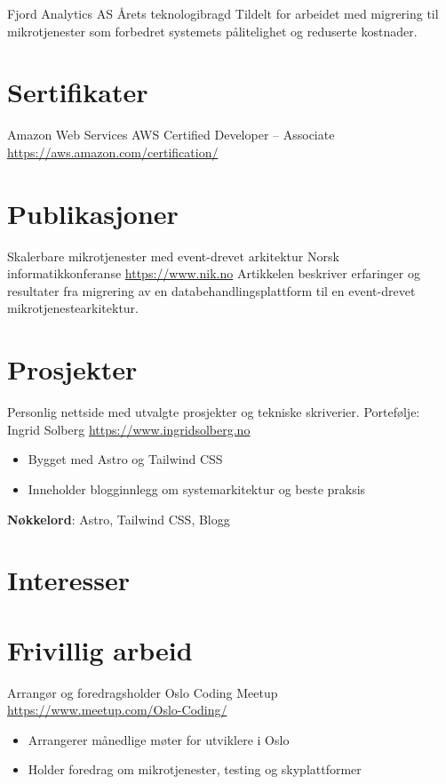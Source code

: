 \documentclass[a4paper, serif, 10pt]{moderncv}
\begin{document}
        {Fjord Analytics AS}
        {Årets teknologibragd}
        {}
        {}
        {Tildelt for arbeidet med migrering til mikrotjenester som forbedret systemets pålitelighet og reduserte kostnader.}
\section{Sertifikater}

        {Amazon Web Services}
        {AWS Certified Developer – Associate}
        {\url{https://aws.amazon.com/certification/}}
        {}
        {}
\section{Publikasjoner}

        {Skalerbare mikrotjenester med event-drevet arkitektur}
        {Norsk informatikkonferanse}
        {\url{https://www.nik.no}}
        {}
        {Artikkelen beskriver erfaringer og resultater fra migrering av en databehandlingsplattform til en event-drevet mikrotjenestearkitektur.}
\section{Prosjekter}

        {Personlig nettside med utvalgte prosjekter og tekniske skriverier.}
        {Portefølje: Ingrid Solberg}
        {\url{https://www.ingridsolberg.no}}
        {}
        {\begin{itemize}
\item Bygget med Astro og Tailwind CSS
\item Inneholder blogginnlegg om systemarkitektur og beste praksis
\end{itemize}
\textbf{Nøkkelord}: Astro, Tailwind CSS, Blogg}
\section{Interesser}

\section{Frivillig arbeid}

        {Arrangør og foredragsholder}
        {Oslo Coding Meetup}
        {\url{https://www.meetup.com/Oslo-Coding/}}
        {}
        {\begin{itemize}
\item Arrangerer månedlige møter for utviklere i Oslo
\item Holder foredrag om mikrotjenester, testing og skyplattformer
\end{itemize}}
    
\end{document}
